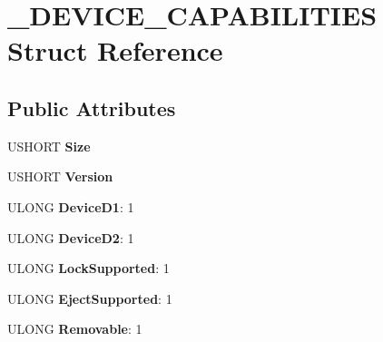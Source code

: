 \hypertarget{struct__DEVICE__CAPABILITIES}{}\section{\+\_\+\+D\+E\+V\+I\+C\+E\+\_\+\+C\+A\+P\+A\+B\+I\+L\+I\+T\+I\+E\+S Struct Reference}
\label{struct__DEVICE__CAPABILITIES}
\subsection*{Public Attributes}
\begin{DoxyCompactItemize}
\item 
\hypertarget{struct__DEVICE__CAPABILITIES_aa0a8257ea495477e95d66f8c5fcaac8a}{}U\+S\+H\+O\+R\+T {\bfseries Size}\label{struct__DEVICE__CAPABILITIES_aa0a8257ea495477e95d66f8c5fcaac8a}

\item 
\hypertarget{struct__DEVICE__CAPABILITIES_a068c63f03cdd5006816b65879eef1ed7}{}U\+S\+H\+O\+R\+T {\bfseries Version}\label{struct__DEVICE__CAPABILITIES_a068c63f03cdd5006816b65879eef1ed7}

\item 
\hypertarget{struct__DEVICE__CAPABILITIES_a3663f38bbd13468933945bce7d8c1106}{}U\+L\+O\+N\+G {\bfseries Device\+D1}\+: 1\label{struct__DEVICE__CAPABILITIES_a3663f38bbd13468933945bce7d8c1106}

\item 
\hypertarget{struct__DEVICE__CAPABILITIES_a256e560097866d4f6bb4e70bcd9a731d}{}U\+L\+O\+N\+G {\bfseries Device\+D2}\+: 1\label{struct__DEVICE__CAPABILITIES_a256e560097866d4f6bb4e70bcd9a731d}

\item 
\hypertarget{struct__DEVICE__CAPABILITIES_a4ea04974038bcfd8280b54fd6ef792f6}{}U\+L\+O\+N\+G {\bfseries Lock\+Supported}\+: 1\label{struct__DEVICE__CAPABILITIES_a4ea04974038bcfd8280b54fd6ef792f6}

\item 
\hypertarget{struct__DEVICE__CAPABILITIES_a7d2d255fa3f70e9af033d0844dec8580}{}U\+L\+O\+N\+G {\bfseries Eject\+Supported}\+: 1\label{struct__DEVICE__CAPABILITIES_a7d2d255fa3f70e9af033d0844dec8580}

\item 
\hypertarget{struct__DEVICE__CAPABILITIES_aecbda3dc4df822d4447c4488456b6cfd}{}U\+L\+O\+N\+G {\bfseries Removable}\+: 1\label{struct__DEVICE__CAPABILITIES_aecbda3dc4df822d4447c4488456b6cfd}


\end{DoxyCompactItemize}
